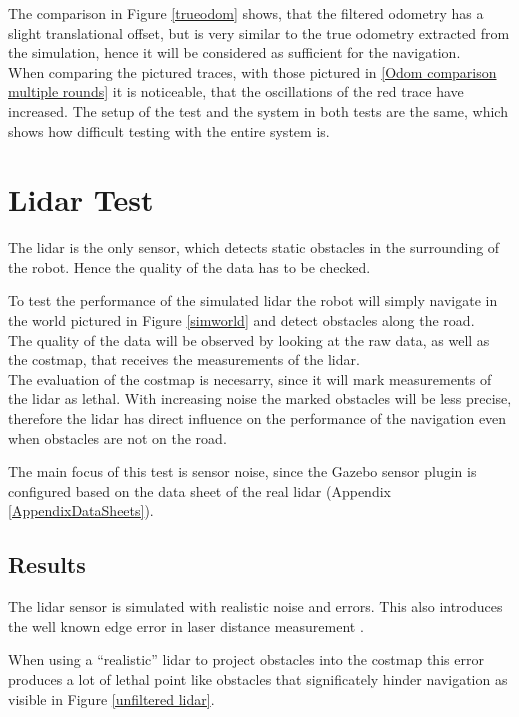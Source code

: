 The comparison in Figure \ref{trueodom} shows, that the filtered odometry has a slight translational offset, but is very similar to the true odometry extracted from the simulation, hence it will be considered as sufficient for the navigation.\\
When comparing the pictured traces, with those pictured in \ref{Odom comparison multiple rounds} it is noticeable, that the oscillations of the red trace have increased. The setup of the test and the system in both tests are the same, which shows how difficult testing with the entire system is.

\section{Lidar Test}
The lidar is the only sensor, which detects static obstacles in the surrounding of the robot. Hence the quality of the data has to be checked.

To test the performance of the simulated lidar the robot will simply navigate in the world pictured in Figure \ref{simworld} and detect obstacles along the road.\\

The quality of the data will be observed by looking at the raw data, as well as the costmap, that receives the measurements of the lidar.\\

The evaluation of the costmap is necesarry, since it will mark measurements of the lidar as lethal. With increasing noise the marked obstacles will be less precise, therefore the lidar has direct influence on the performance of the navigation even when obstacles are not on the road.

The main focus of this test is sensor noise, since the Gazebo sensor plugin is configured based on the data sheet of the real lidar (Appendix \ref{AppendixDataSheets}).

\subsection{Results}
The lidar sensor is simulated with realistic noise and errors. This also introduces the well known edge error in laser distance measurement \cite{edgeeffect}. 

When using a ``realistic'' lidar to project obstacles into the costmap this error produces a lot of lethal point like obstacles that significately hinder navigation as visible in Figure \ref{unfiltered lidar}.

